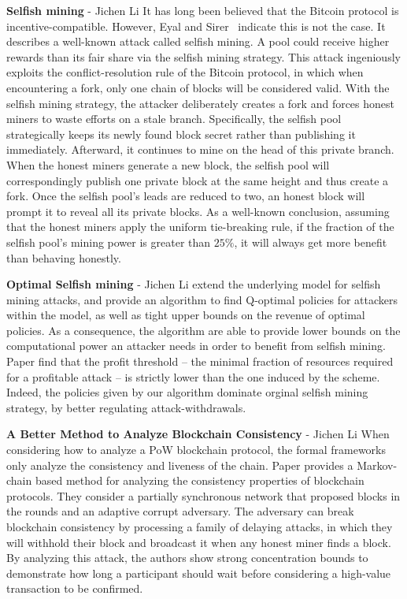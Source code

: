\textbf{Selfish mining} - Jichen Li
It has long been believed that the Bitcoin protocol is incentive-compatible. However, Eyal and Sirer~\cite{eyal2014majority} indicate this is not the case. It describes a well-known attack called selfish mining. A pool could receive higher rewards than its fair share via the selfish mining strategy. This attack ingeniously exploits the conflict-resolution rule of the Bitcoin protocol, in which when encountering a fork, only one chain of blocks will be considered valid. With the selfish mining strategy, the attacker deliberately creates a fork and forces honest miners to waste efforts on a stale branch. Specifically, the selfish pool strategically keeps its newly found block secret rather than publishing it immediately. Afterward, it continues to mine on the head of this private branch. When the honest miners generate a new block, the selfish pool will correspondingly publish one private block at the same height and thus create a fork. Once the selfish pool's leads are reduced to two, an honest block will prompt it to reveal all its private blocks. As a well-known conclusion, assuming that the honest miners apply the uniform tie-breaking rule, if the fraction of the selfish pool's mining power is greater than $25\%$, it will always get more benefit than behaving honestly.

\textbf{Optimal Selfish mining} - Jichen Li
\cite{sapirshtein2016optimal} extend the underlying model for selfish mining attacks, and provide an algorithm to find Q-optimal policies for attackers within the model, as well as tight upper bounds on the revenue of optimal policies. 
As a consequence, the algorithm are able to provide lower bounds on the computational power an attacker needs in order to benefit from selfish mining. 
Paper find that the profit threshold – the minimal fraction of resources required for a profitable attack – is strictly lower than the one induced by the \cite{eyal2014majority} scheme. Indeed, the policies given by our algorithm dominate orginal selfish mining strategy, by better regulating attack-withdrawals.

\textbf{A Better Method to Analyze Blockchain Consistency} - Jichen Li
When considering how to analyze a PoW blockchain protocol, the formal frameworks only analyze the consistency and liveness of the chain.
Paper \cite{kiffer2018better} provides a Markov-chain based method for analyzing the consistency properties of blockchain protocols.
They consider a partially synchronous network that proposed blocks in the rounds and an adaptive corrupt adversary.
The adversary can break blockchain consistency by processing a family of delaying attacks, in which they will withhold their block and broadcast it when any honest miner finds a block.
By analyzing this attack, the authors show strong concentration bounds to demonstrate how long a participant should wait before considering a high-value transaction to be confirmed.

